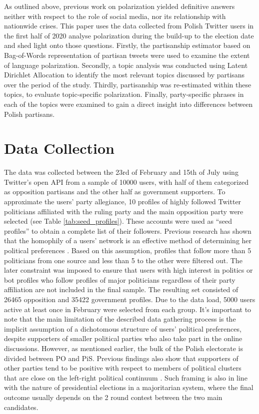 \documentclass{article}
\begin{document}
	As outlined above, previous work on polarization yielded definitive answers neither with respect to the role of social media, nor its relationship with nationwide crises. This paper uses the data collected from Polish Twitter users in the first half of 2020 analyse polarization during the build-up to the election date and shed light onto those questions. Firstly, the partisanship estimator \citep{gentzkow2019} based on Bag-of-Words representation of partisan tweets were used to examine the extent of language polarization. Secondly, a topic analysis was conducted using Latent Dirichlet Allocation to identify the most relevant topics discussed by partisans over the period of the study. Thirdly, partisanship was re-estimated within these topics, to evaluate topic-specific polarization. Finally, party-specific phrases in each of the topics were examined to gain a direct insight into differences between Polish partisans.
	
	\section*{Data Collection}
	
	The data was collected between the 23rd of February and 15th of July using Twitter's open API from a sample of 10000 users, with half of them categorized as opposition partisans and the other half as government supporters. To approximate the users’ party allegiance, 10 profiles of highly followed Twitter politicians affiliated with the ruling party and the main opposition party were selected (see Table \ref{tab:seed_profiles}). These accounts were used as “seed profiles” to obtain a complete list of their followers. Previous research has shown that the homophily of a users’ network is an effective method of determining her political preferences \citep{volkova2014}. Based on this assumption, profiles that follow more than 5 politicians from one source and less than 5 to the other were filtered out. The later constraint was imposed to ensure that users with high interest in politics or bot profiles who follow profiles of major politicians regardless of their party affiliation are not included in the final sample. The resulting set consisted of 26465 opposition and 35422 government profiles. Due to the data load, 5000 users active at least once in February were selected from each group. It’s important to note that the main limitation of the described data gathering process is the implicit assumption of a dichotomous structure of users’ political preferences, despite supporters of smaller political parties who also take part in the online discussions. However, as mentioned earlier, the bulk of the Polish electorate is divided between PO and PiS. Previous findings also show that supporters of other parties tend to be positive with respect to members of political clusters that are close on the left-right political continuum \citep{matuszewski2018}. Such framing is also in line with the nature of presidential elections in a majoritarian system, where the final outcome usually depends on the 2 round contest between the two main candidates.
	
\end{document}
